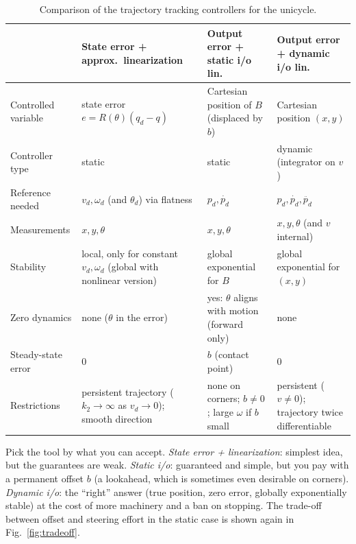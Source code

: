 \documentclass[11pt,a4paper]{article}
\def\bm#1{#1}%
\def\vect#1{#1}%
\newcommand{\vect}[1]{\bm{#1}}
\newcommand{\vd}{v_d}
\newcommand{\omd}{\omega_d}
\newcommand{\pd}{\vect{p}_d}
\newcommand{\qd}{\vect{q}_d}
\theoremstyle{definition}
\theoremstyle{plain}
\theoremstyle{remark}
\begin{document}
\begin{table}[H]
\centering\footnotesize
\setlength{\tabcolsep}{4pt}
\begin{tabularx}{\textwidth}{@{}>{\raggedright\arraybackslash}p{2.35cm}>{\raggedright\arraybackslash}X>{\raggedright\arraybackslash}X>{\raggedright\arraybackslash}X@{}}
\toprule
 & \textbf{State error + approx.\ linearization} & \textbf{Output error + static i/o lin.} & \textbf{Output error + dynamic i/o lin.}\\
\midrule
Controlled variable & state error $\vect e=\vect R(\theta)(\qd-\vect q)$ & Cartesian position of $B$ (displaced by $b$) & Cartesian position $(x,y)$\\
Controller type & static & static & dynamic (integrator on $v$)\\
Reference needed & $\vd,\omd$ (and $\theta_d$) via flatness & $\pd,\dot{\pd}$ & $\pd,\dot{\pd},\ddot{\pd}$\\
Measurements & $x,y,\theta$ & $x,y,\theta$ & $x,y,\theta$ (and $v$ internal)\\
Stability & local, only for constant $\vd,\omd$ (global with nonlinear version) & global exponential for $B$ & global exponential for $(x,y)$\\
Zero dynamics & none ($\theta$ in the error) & yes: $\theta$ aligns with motion (forward only) & none\\
Steady-state error & $0$ & $b$ (contact point) & $0$\\
Restrictions & persistent trajectory ($k_2\to\infty$ as $\vd\to0$); smooth direction & none on corners; $b\neq0$; large $\omega$ if $b$ small & persistent ($v\neq0$); trajectory twice differentiable\\
\bottomrule
\end{tabularx}
\caption{Comparison of the trajectory tracking controllers for the unicycle.}
\end{table}

\begin{intuition}
Pick the tool by what you can accept. \emph{State error + linearization}: simplest idea, but the guarantees are weak. \emph{Static i/o}: guaranteed and simple, but you pay with a permanent offset $b$ (a lookahead, which is sometimes even desirable on corners). \emph{Dynamic i/o}: the ``right'' answer (true position, zero error, globally exponentially stable) at the cost of more machinery and a ban on stopping. The trade-off between offset and steering effort in the static case is shown again in Fig.~\ref{fig:tradeoff}.
\end{intuition}
\end{document}
